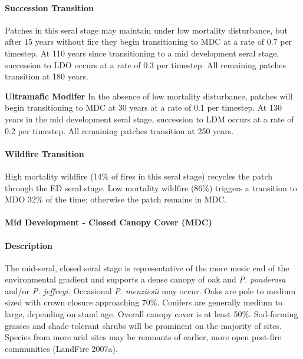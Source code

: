 \paragraph{Succession Transition} Patches in this seral stage may maintain under low mortality disturbance, but after 15 years without fire they begin transitioning to MDC at a rate of 0.7 per timestep. At 110 years since transitioning to a mid development seral stage, succession to LDO occurs at a rate of 0.3 per timestep. All remaining patches transition at 180 years.
\begin{adjustwidth}{2cm}{}

\textbf{Ultramafic Modifer}  In the absence of low mortality disturbance, patches will begin transitioning to MDC at 30 years at a rate of 0.1 per timestep. At 130 years in the mid development seral stage, succession to LDM occurs at a rate of 0.2 per timestep. All remaining patches transition at 250 years.

\end{adjustwidth}
\paragraph{Wildfire Transition}
High mortality wildfire (14\% of fires in this seral stage) recycles the patch through the ED seral stage. Low mortality wildfire (86\%) triggers a transition to MDO 32\% of the time; otherwise the patch remains in MDC.

\noindent\hrulefill

\paragraph{Mid Development - Closed Canopy Cover (MDC)}

\paragraph{Description} The mid-seral, closed seral stage is representative of the more mesic end of the environmental gradient and supports a dense canopy of oak and \emph{P. ponderosa} and/or \emph{P. jeffreyi}. Occasional \emph{P. menziesii} may occur. Oaks are pole to medium sized with crown closure approaching 70\%. Conifers are generally medium to large, depending on stand age. Overall canopy cover is at least 50\%. Sod-forming grasses and shade-tolerant shrubs will be prominent on the majority of sites. Species from more arid sites may be remnants of earlier, more open post-fire communities (LandFire 2007a).


